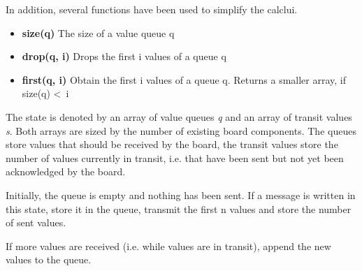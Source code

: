 \documentclass{report}
\begin{document}
In addition, several functions have been used to simplify the calclui.
\begin{itemize} \itemsep1pt \parskip0pt 
\item \textbf{size(q)} The size of a value queue q
\item \textbf{drop(q, i)} Drops the first i values of a queue q
\item \textbf{first(q, i)} Obtain the first i values of a queue q. Returns a smaller array, if size(q) \textless ~i
\end{itemize}

The state is denoted by an array of value queues \textit{q} and an array of transit values \textit{s}. Both arrays are sized by the number of existing board components. The queues store values that should be received by the board, the transit values store the number of values currently in transit, i.e. that have been sent but not yet been acknowledged by the board.

\begin{mathpar}
\end{mathpar}
Initially, the queue is empty and nothing has been sent. If a message is written in this state, store it in the queue, transmit the first n values and store the number of sent values.


\begin{mathpar}
\end{mathpar}
If more values are received (i.e. while values are in transit), append the new values to the queue.
\end{document}
